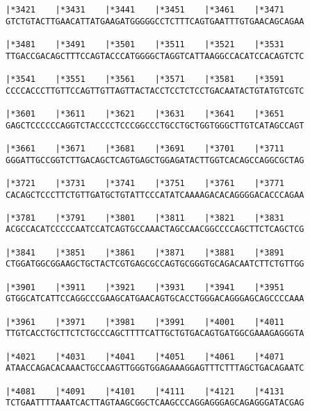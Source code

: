 \documentclass{article}
\begin{document}
\begin{Verbatim}
|*3421    |*3431    |*3441    |*3451    |*3461    |*3471    
GTCTGTACTTGAACATTATGAAGATGGGGGCCTCTTTCAGTGAATTTGTGAACAGCAGAA
                                                            
|*3481    |*3491    |*3501    |*3511    |*3521    |*3531    
TTGACCGACAGCTTTCCAGTACCCATGGGGCTAGGTCATTAAGGCCACATCCACAGTCTC
                                                            
|*3541    |*3551    |*3561    |*3571    |*3581    |*3591    
CCCCACCCTTGTTCCAGTTGTTAGTTACTACCTCCTCTCCTGACAATACTGTATGTCGTC
                                                            
|*3601    |*3611    |*3621    |*3631    |*3641    |*3651    
GAGCTCCCCCCAGGTCTACCCCTCCCGGCCCTGCCTGCTGGTGGGCTTGTCATAGCCAGT
                                                            
|*3661    |*3671    |*3681    |*3691    |*3701    |*3711    
GGGATTGCCGGTCTTGACAGCTCAGTGAGCTGGAGATACTTGGTCACAGCCAGGCGCTAG
                                                            
|*3721    |*3731    |*3741    |*3751    |*3761    |*3771    
CACAGCTCCCTTCTGTTGATGCTGTATTCCCATATCAAAAGACACAGGGGACACCCAGAA
                                                            
|*3781    |*3791    |*3801    |*3811    |*3821    |*3831    
ACGCCACATCCCCCAATCCATCAGTGCCAAACTAGCCAACGGCCCCAGCTTCTCAGCTCG
                                                            
|*3841    |*3851    |*3861    |*3871    |*3881    |*3891    
CTGGATGGCGGAAGCTGCTACTCGTGAGCGCCAGTGCGGGTGCAGACAATCTTCTGTTGG
                                                            
|*3901    |*3911    |*3921    |*3931    |*3941    |*3951    
GTGGCATCATTCCAGGCCCGAAGCATGAACAGTGCACCTGGGACAGGGAGCAGCCCCAAA
                                                            
|*3961    |*3971    |*3981    |*3991    |*4001    |*4011    
TTGTCACCTGCTTCTCTGCCCAGCTTTTCATTGCTGTGACAGTGATGGCGAAAGAGGGTA
                                                            
|*4021    |*4031    |*4041    |*4051    |*4061    |*4071    
ATAACCAGACACAAACTGCCAAGTTGGGTGGAGAAAGGAGTTTCTTTAGCTGACAGAATC
                                                            
|*4081    |*4091    |*4101    |*4111    |*4121    |*4131    
TCTGAATTTTAAATCACTTAGTAAGCGGCTCAAGCCCAGGAGGGAGCAGAGGGATACGAG
                                                            

\end{Verbatim}
\end{document}
